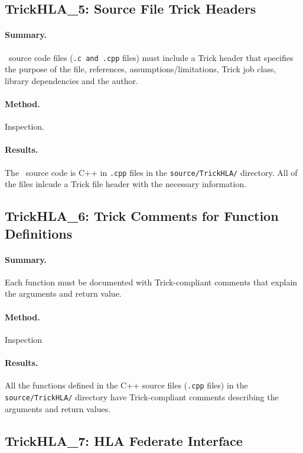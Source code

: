 \subsection{TrickHLA\_5: Source File Trick Headers}
\paragraph{Summary.}
\TrickHLA\ source code files ({\tt .c and .cpp} files)
must include a Trick header that specifies
the purpose of the file, references, assumptions/limitations,
Trick job class, library dependencies and the author.
\paragraph{Method.} Inspection.
\paragraph{Results.}
The \TrickHLA\ source code is C++ in {\tt .cpp} files in the
{\tt source/TrickHLA/} directory.
All of the files inlcude a Trick file header with the necessary information.

\subsection{TrickHLA\_6: Trick Comments for Function Definitions}
\paragraph{Summary.} Each function must be documented with Trick-compliant
comments that explain the arguments and return value.
\paragraph{Method.} Inspection
\paragraph{Results.}
All the functions defined in the C++ source files ({\tt .cpp} files)
in the {\tt source/TrickHLA/} directory have Trick-compliant comments describing
the arguments and return values.

\subsection{TrickHLA\_7: HLA Federate Interface}
